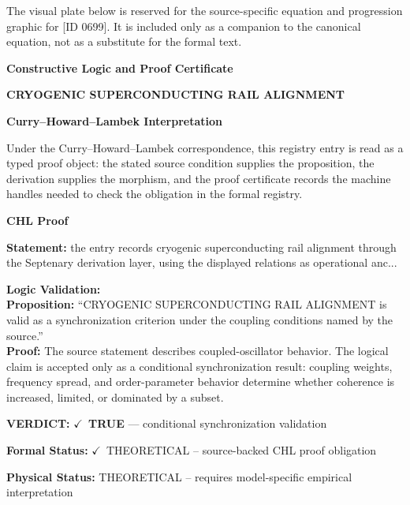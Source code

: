 \begingroup\footnotesize\sloppy
The visual plate below is reserved for the source-specific equation and progression graphic for [ID 0699]. It is included only as a companion to the canonical equation, not as a substitute for the formal text.
\par\endgroup
\ifTZPDarkEdition
{}
\fi

\clearpage
\begingroup\tzpsupportsetup
\noindent\textbf{\fontsize{10.8pt}{12.8pt}\selectfont [ID 0699] Constructive Logic and Proof Certificate}\par
\noindent\textbf{\fontsize{10pt}{12pt}\selectfont CRYOGENIC SUPERCONDUCTING RAIL ALIGNMENT}\par
\vspace{0.45em}
\begingroup
\footnotesize
\setlength{\parskip}{0.22em}
\setlength{\parindent}{0pt}
\noindent\textbf{Curry--Howard--Lambek Interpretation}\par
Under the Curry--Howard--Lambek correspondence, this registry entry is read as a typed proof
object: the stated source condition supplies the proposition, the derivation supplies the
morphism, and the proof certificate records the machine handles needed to check the obligation
in the formal registry.

\vspace{0.45em}
\noindent\textbf{CHL Proof}\par
\textbf{Statement:} the entry records cryogenic superconducting rail alignment through the Septenary
derivation layer, using the displayed relations as operational anc...

\textbf{Logic Validation:}\\
\textbf{Proposition:} ``CRYOGENIC SUPERCONDUCTING RAIL ALIGNMENT is valid as a synchronization criterion under
the coupling conditions named by the source.''\\
\textbf{Proof:} The source statement describes coupled-oscillator behavior. The logical claim is
accepted only as a conditional synchronization result: coupling weights, frequency
spread, and order-parameter behavior determine whether coherence is increased, limited,
or dominated by a subset.

\textbf{VERDICT:} \ensuremath{\checkmark}\ \textbf{TRUE} --- conditional synchronization validation

\textbf{Formal Status:} \ensuremath{\checkmark}\ THEORETICAL -- source-backed CHL proof obligation

\textbf{Physical Status:} THEORETICAL -- requires model-specific empirical interpretation
\par\vspace{0.45em}
\par
\ifTZPDarkEdition
{}
\fi
\endgroup
\endgroup
